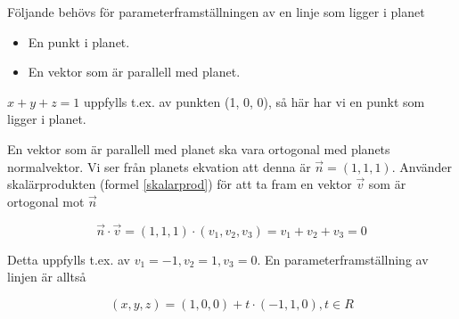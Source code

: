 \documentclass[../../main.tex]{subfiles}
\begin{document}
\begin{solution}{11} 

Följande behövs för parameterframställningen av en linje som ligger i planet
\begin{itemize}
    \item En punkt i planet.
    \item En vektor som är parallell med planet.
\end{itemize}

$x + y + z = 1$ uppfylls t.ex. av punkten (1, 0, 0), så här har vi en punkt som ligger i planet.

En vektor som är parallell med planet ska vara ortogonal med planets normalvektor. Vi ser från planets ekvation att denna är $\Vec{n} = (1, 1, 1)$. Använder skalärprodukten (formel \ref{skalarprod}) för att ta fram en vektor $\Vec{v}$ som är ortogonal mot $\Vec{n}$

\[\Vec{n} \cdot \Vec{v} = (1, 1, 1) \cdot (v_1, v_2, v_3) =
v_1 + v_2 + v_3 = 0\]

Detta uppfylls t.ex. av $v_1 = -1, v_2 = 1, v_3 = 0$. En parameterframställning av linjen är alltså

\[(x, y, z) = (1, 0, 0) + t \cdot (-1, 1, 0), t\in R\]

\end{solution}
\end{document}

